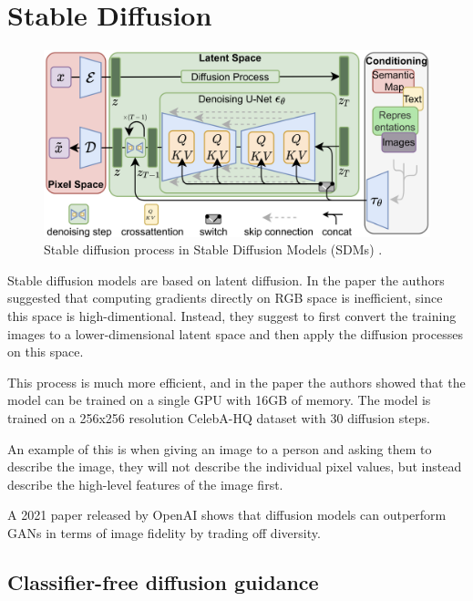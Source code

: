 \section{Stable Diffusion}
\label{sec:stable_diffusion}

\begin{figure}
    \centering
    \includegraphics[width=1\textwidth]{images/diffusion_models/stable_diffusion.png}
    \caption{Stable diffusion process in Stable Diffusion Models (SDMs) \cite{stable_diffusion}.}
    \label{fig:stable_diffusion}
\end{figure}

Stable diffusion models are based on latent diffusion. In the paper \cite{stable_diffusion} the authors suggested that computing gradients directly on RGB space is inefficient, since this space is high-dimentional. Instead, they suggest to first convert the training images to a lower-dimensional latent space and then apply the diffusion processes on this space.

This process is much more efficient, and in the paper \cite{stable_diffusion} the authors showed that the model can be trained on a single GPU with 16GB of memory. The model is trained on a 256x256 resolution CelebA-HQ dataset with 30 diffusion steps.

An example of this is when giving an image to a person and asking them to describe the image, they will not describe the individual pixel values, but instead describe the high-level features of the image first.

A 2021 paper released by OpenAI \cite{openai_diffusion_beats_gans} shows that diffusion models can outperform GANs in terms of image fidelity by trading off diversity.








\subsection{Classifier-free diffusion guidance}

